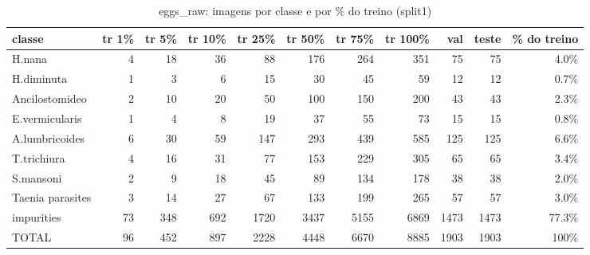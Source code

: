 \begin{table}[h]\centering\small
\caption{eggs_raw: imagens por classe e por \% do treino (split1)}
\begin{tabular}{lrrrrrrrrrr}\toprule
classe & tr 1\% & tr 5\% & tr 10\% & tr 25\% & tr 50\% & tr 75\% & tr 100\% & val & teste & \% do treino \\\midrule
H.nana & 4 & 18 & 36 & 88 & 176 & 264 & 351 & 75 & 75 & 4.0\% \\
H.diminuta & 1 & 3 & 6 & 15 & 30 & 45 & 59 & 12 & 12 & 0.7\% \\
Ancilostomideo & 2 & 10 & 20 & 50 & 100 & 150 & 200 & 43 & 43 & 2.3\% \\
E.vermicularis & 1 & 4 & 8 & 19 & 37 & 55 & 73 & 15 & 15 & 0.8\% \\
A.lumbricoides & 6 & 30 & 59 & 147 & 293 & 439 & 585 & 125 & 125 & 6.6\% \\
T.trichiura & 4 & 16 & 31 & 77 & 153 & 229 & 305 & 65 & 65 & 3.4\% \\
S.mansoni & 2 & 9 & 18 & 45 & 89 & 134 & 178 & 38 & 38 & 2.0\% \\
Taenia parasites & 3 & 14 & 27 & 67 & 133 & 199 & 265 & 57 & 57 & 3.0\% \\
impurities & 73 & 348 & 692 & 1720 & 3437 & 5155 & 6869 & 1473 & 1473 & 77.3\% \\
\midrule TOTAL & 96 & 452 & 897 & 2228 & 4448 & 6670 & 8885 & 1903 & 1903 & 100\% \\\bottomrule
\end{tabular}\end{table}
